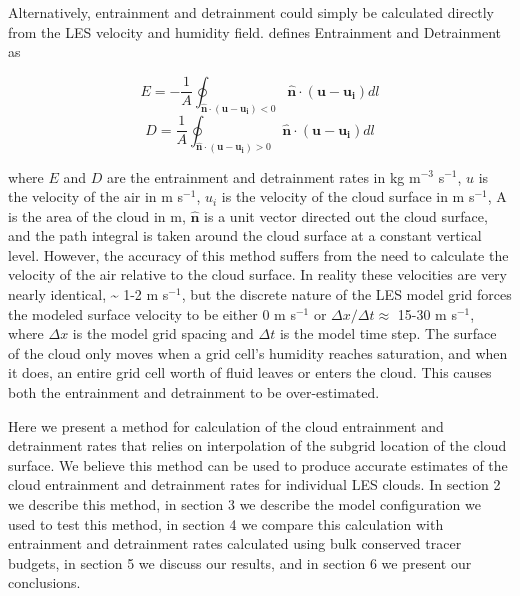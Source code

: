 \documentclass[12pt]{article}
\begin{document}
Alternatively, entrainment and detrainment could simply be calculated
directly from the LES velocity and humidity field.  \cite{Siebesma1998} 
defines Entrainment and Detrainment as

\begin{equation}
E = -\frac{1}{A}\oint_{\mathbf{\hat{n}}\cdot(\mathbf{u} - \mathbf{u_i}) < 0}
\mathbf{\hat{n}}\cdot(\mathbf{u}-\mathbf{u_i})dl
\end{equation}
\begin{equation}
D = \frac{1}{A}\oint_{\mathbf{\hat{n}}\cdot(\mathbf{u} - \mathbf{u_i}) > 0}
\mathbf{\hat{n}}\cdot(\mathbf{u}-\mathbf{u_i})dl
\end{equation}

where $E$ and $D$ are the entrainment and detrainment rates in kg 
m$^{-3}$ s$^{-1}$, $u$ is the velocity of the air in m s$^{-1}$, $u_i$ is the 
velocity of the cloud surface in m s$^{-1}$, A is the area of the cloud in m,
$\mathbf{\hat{n}}$ is a unit vector directed out the cloud surface, and the 
path integral is taken around the cloud surface at a constant vertical level.
However, the accuracy of this method suffers from the need to calculate the 
velocity of the air relative to the cloud surface.  In reality these velocities 
are very nearly identical, \textasciitilde{} 1-2 m s$^{-1}$, but the discrete 
nature of the LES model grid forces the modeled surface velocity to be either 
0 m s$^{-1}$ or $\Delta x / \Delta t \approx$ 15-30 m s$^{-1}$, where 
$\Delta x$ is the model grid spacing and $\Delta t$ is the model time step.  The
surface of the cloud only moves when a grid cell's humidity reaches saturation, 
and when it does, an entire grid cell worth of fluid leaves or enters the cloud.
This causes both the entrainment and detrainment to be over-estimated.

Here we present a method for calculation of the cloud entrainment and 
detrainment rates that relies on interpolation of the subgrid location 
of the cloud surface.  We believe this method can be used to produce accurate
estimates of the cloud entrainment and detrainment rates for individual LES
clouds.  In section 2 we describe this method, in section 3 we describe the 
model configuration we used to test this method, in section 4 we compare this
calculation with entrainment and detrainment rates calculated using bulk
conserved tracer budgets, in section 5 we discuss our results, and in section 6
we present our conclusions.  

\end{document}
